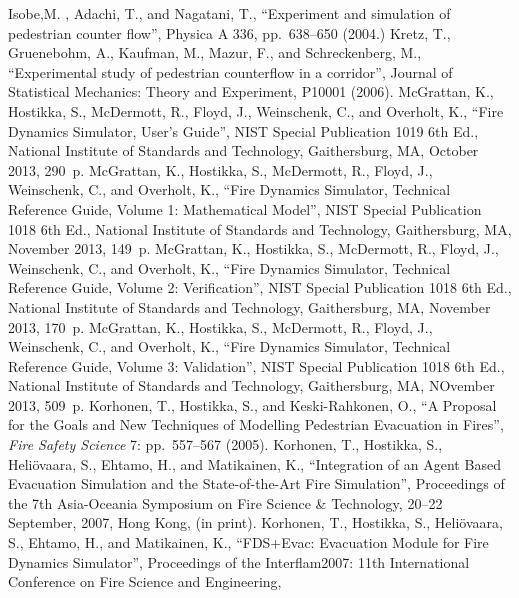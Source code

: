 \documentclass[12pt,a4paper,final,twoside]{stylevk}
\begin{document}
\renewcommand{\bibname}{References}
\begin{thebibliography}{99}
%
 Isobe,M. , Adachi, T., and Nagatani, T.,
  ``Experiment and simulation of pedestrian counter flow'', Physica A
  336, pp.\ 638--650 (2004.)
%
 Kretz, T., Gruenebohm, A., Kaufman, M., Mazur, F.,
  and Schreckenberg, M., ``Experimental study of pedestrian
  counterflow in a corridor'', Journal of Statistical Mechanics:
  Theory and Experiment, P10001 (2006).
%
 McGrattan, K., Hostikka, S., McDermott, R.,
  Floyd, J., Weinschenk, C., and Overholt, K., ``Fire Dynamics
  Simulator, User's Guide'', NIST Special Publication 1019 6th Ed.,
  National Institute of Standards and Technology, Gaithersburg, MA,
  October 2013, 290~p.
%
 McGrattan, K., Hostikka, S., McDermott, R.,
  Floyd, J., Weinschenk, C., and Overholt, K., ``Fire Dynamics
  Simulator, Technical Reference Guide, Volume 1: Mathematical
  Model'', NIST Special Publication 1018 6th Ed., National Institute
  of Standards and Technology, Gaithersburg, MA, November 2013, 149~p.
%
 McGrattan, K., Hostikka, S., McDermott, R.,
  Floyd, J., Weinschenk, C., and Overholt, K., ``Fire Dynamics
  Simulator, Technical Reference Guide, Volume 2: Verification'', NIST
  Special Publication 1018 6th Ed., National Institute of Standards
  and Technology, Gaithersburg, MA, November 2013, 170~p.
%
 McGrattan, K., Hostikka, S., McDermott, R.,
  Floyd, J., Weinschenk, C., and Overholt, K., ``Fire Dynamics
  Simulator, Technical Reference Guide, Volume 3: Validation'', NIST
  Special Publication 1018 6th Ed., National Institute of Standards
  and Technology, Gaithersburg, MA, NOvember 2013, 509~p.
%
 Korhonen, T., Hostikka, S., and Keski-Rahkonen,
  O., ``A Proposal for the Goals and New Techniques of Modelling
  Pedestrian Evacuation in Fires'',  \emph{Fire Safety Science} 7:
  pp.~557--567 (2005). 
%
 Korhonen, T., Hostikka, S., Heli\"ovaara, S.,
  Ehtamo, H., and Matikainen, K., ``Integration of an Agent Based
  Evacuation Simulation and the State-of-the-Art Fire Simulation'',
  Proceedings of the 7th Asia-Oceania Symposium on Fire Science \&
  Technology, 20--22 September, 2007, Hong Kong, (in print).
%
 Korhonen, T., Hostikka, S., Heli\"ovaara, S.,
  Ehtamo, H., and Matikainen, K., ``FDS+Evac: Evacuation Module for
  Fire Dynamics Simulator'', Proceedings of the Interflam2007: 11th
  International Conference on Fire Science and Engineering,

\end{thebibliography}
\end{document}

